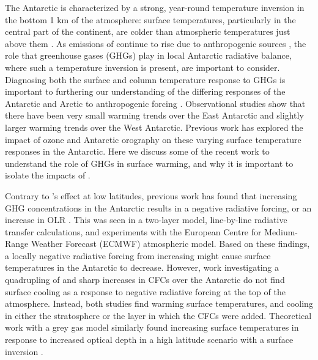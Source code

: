 \documentclass[draft]{agujournal2019}
\begin{document}
The Antarctic is characterized by a strong, year-round temperature inversion in the bottom 1 km of the atmosphere: surface temperatures, particularly in the central part of the continent, are colder than atmospheric temperatures just above them \cite{hudson_look_2005}. As emissions of  continue to rise due to anthropogenic sources \cite{peters_carbon_2020}, the role that greenhouse gases (GHGs) play in local Antarctic radiative balance, where such a temperature inversion is present, are important to consider. Diagnosing both the surface and column temperature response to GHGs is important to furthering our understanding of the differing responses of the Antarctic and Arctic to anthropogenic forcing \cite{manabe_sensitivity_1980}. Observational studies show that there have been very small warming trends over the East Antarctic \cite{smith_spatial_2017} and slightly larger warming trends over the West Antarctic. Previous work has explored the impact of ozone \cite{chiodo_large_2017} and Antarctic orography \cite{singh_low_2020} on these varying surface temperature responses in the Antarctic. Here we discuss some of the recent work to understand the role of GHGs in surface warming, and why it is important to isolate the impacts of . 

Contrary to 's effect at low latitudes, previous work has found that increasing GHG concentrations in the Antarctic results in a negative radiative forcing, or an increase in OLR \cite{schmithusen_how_2015,huang_inhomogeneous_2016}. This was seen in a two-layer model, line-by-line radiative transfer calculations, and experiments with the European Centre for Medium-Range Weather Forecast (ECMWF) atmospheric model. Based on these findings, a locally negative radiative forcing from increasing  might cause surface temperatures in the Antarctic to decrease. However, work investigating a quadrupling of  \cite{smith_no_2018} and sharp increases in CFCs over the Antarctic \cite{flanner_climate_2018} do not find surface cooling as a response to negative radiative forcing at the top of the atmosphere. Instead, both studies find warming surface temperatures, and cooling in either the stratosphere or the layer in which the CFCs were added. Theoretical work with a grey gas model similarly found increasing surface temperatures in response to increased optical depth in a high latitude scenario with a surface inversion \cite{payne_conceptual_2015}.
\end{document}
